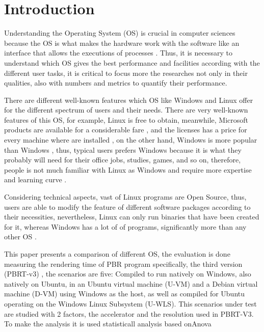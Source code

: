 \documentclass[conference]{IEEEtran}
\begin{document}
\section{Introduction}
Understanding the Operating System (OS) is crucial in computer sciences because the OS is what makes the
hardware work with the software like an
interface that allows the executions of processes \cite{dhamija2012demographics}. Thus, it is necessary to understand which OS gives the best performance and facilities according with the different user tasks, it is critical to focus more the researches not only in their qualities, also with numbers and metrics to quantify their performance. \par
There are different well-known features which OS like Windows and Linux offer for the different spectrum of users and their needs. There are very well-known features of this OS, for example, Linux is free to obtain, meanwhile, Microsoft products are available for a considerable fare \cite{dhamija2012demographics}, and the licenses has a price for every machine where are installed  \cite{duran2006analisis}, on the other hand, Windows is more popular than Windows \cite{duran2006analisis}, thus, typical users prefers Windows because it is what they probably will need for their office jobs, studies, games, and so on, therefore, people is not much familiar with Linux as Windows and require more expertise and learning curve \cite{dhamija2012demographics}.\par
Considering technical aspects, vast of Linux programs are Open Source, thus, users are able to modify the feature of different software packages according to their necessities, nevertheless, Linux can only run binaries that have been  created for it, whereas Windows has a lot of of programs, significantly more than any other OS \cite{dhamija2012demographics}.\par
This paper presents a comparison of different OS, the evaluation is done measuring the rendering time of PBR  program specifically, the third version (PBRT-v3) \cite{PBRT}, the scenarios are five: Compiled to run natively on Windows, also natively on Ubuntu, in an Ubuntu virtual machine (U-VM) and a Debian virtual machine (D-VM) using Windows as the host, as well as compiled for Ubuntu operating on the Windows Linux Subsystem (U-WLS). This scenarios under test are studied with 2 factors, the accelerator and the resolution used in PBRT-V3. To make the analysis it is used statisticall analysis based onAnova
\end{document}
